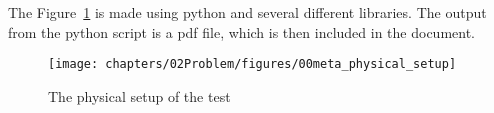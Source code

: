\label{sec:Test}

The Figure~\ref{fig:physical_setup} is made using python and several different libraries.
The output from the python script is a pdf file, which is then included in the document.
\begin{figure}[H]
    \centering
    \texttt{[image: chapters/02Problem/figures/00meta\_physical\_setup]}
    \caption{The physical setup of the test}
    \label{fig:physical_setup}
\end{figure}